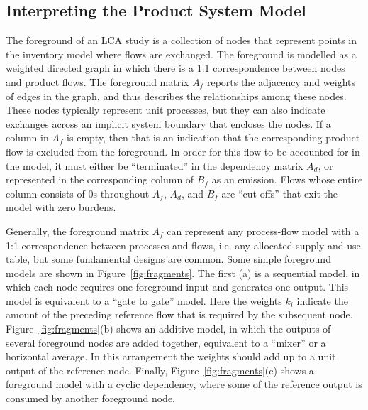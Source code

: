 \subsection{Interpreting the Product System Model}

The foreground of an LCA study is a collection of nodes that represent points in the inventory model where flows are exchanged.  The foreground is modelled as a weighted directed graph in which there is a 1:1 correspondence between nodes and product flows.  The foreground matrix $A_f$ reports the adjacency and weights of edges in the graph, and thus describes the relationships among these nodes.  These nodes typically represent unit processes, but they can also indicate exchanges across an implicit system boundary that encloses the nodes.  If a column in $A_f$ is empty, then that is an indication that the corresponding product flow is excluded from the foreground.  In order for this flow to be accounted for in the model, it must either be ``terminated'' in the dependency matrix $A_d$, or represented in the corresponding column of $B_f$ as an emission.  Flows whose entire column consists of 0s throughout $A_f$, $A_d$, and $B_f$ are ``cut offs'' that exit the model with zero burdens.




Generally, the foreground matrix $A_f$ can represent any process-flow model with a 1:1 correspondence between processes and flows, i.e. any allocated supply-and-use table, but some fundamental designs are common.  Some simple foreground models are shown in Figure~\ref{fig:fragments}.  The first (a) is a sequential model, in which each node requires one foreground input and generates one output. This model is equivalent to a ``gate to gate'' model.  Here the weights $k_i$ indicate the amount of the preceding reference flow that is required by the subsequent node.  Figure~\ref{fig:fragments}(b) shows an additive model, in which the outputs of several foreground nodes are added together, equivalent to a ``mixer'' or a horizontal average.  In this arrangement the weights %
should add up to a unit output of the reference node.  Finally, Figure~\ref{fig:fragments}(c) shows a foreground model with a cyclic dependency, where some of the reference output is consumed by another foreground node.

